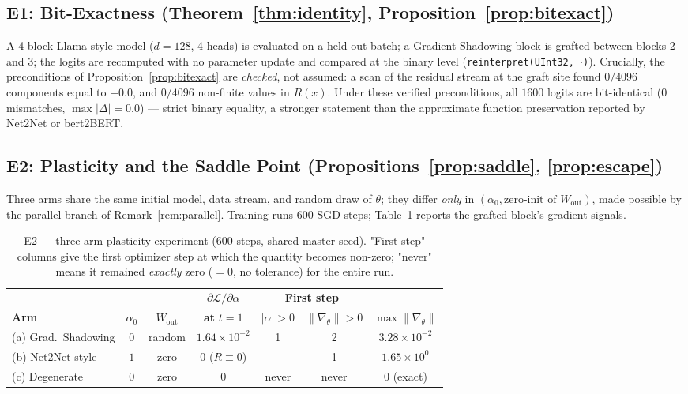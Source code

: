 \documentclass[11pt,a4paper]{article}
\newcommand{\Loss}{\mathcal{L}}
\begin{document}
\subsection{E1: Bit-Exactness (Theorem~\ref{thm:identity}, Proposition~\ref{prop:bitexact})}

A 4-block Llama-style model ($d=128$, 4 heads) is evaluated on a held-out batch; a Gradient-Shadowing block is grafted between blocks 2 and 3; the logits are recomputed with no parameter update and compared at the binary level (\texttt{reinterpret(UInt32, $\cdot$)}). Crucially, the preconditions of Proposition~\ref{prop:bitexact} are \emph{checked}, not assumed: a scan of the residual stream at the graft site found $0/4096$ components equal to $-0.0$, and $0/4096$ non-finite values in $R(x)$. Under these verified preconditions, all $1600$ logits are bit-identical ($0$ mismatches, $\max|\Delta| = 0.0$) --- strict binary equality, a stronger statement than the approximate function preservation reported by Net2Net or bert2BERT.

\subsection{E2: Plasticity and the Saddle Point (Propositions~\ref{prop:saddle}, \ref{prop:escape})}

Three arms share the same initial model, data stream, and random draw of $\theta$; they differ \emph{only} in $(\alpha_0, \text{zero-init of } W_{\mathrm{out}})$, made possible by the parallel branch of Remark~\ref{rem:parallel}. Training runs 600 SGD steps; Table~\ref{tab:e2} reports the grafted block's gradient signals.

\begin{table}[htbp]
\centering
\caption{E2 --- three-arm plasticity experiment (600 steps, shared master seed). "First step" columns give the first optimizer step at which the quantity becomes non-zero; "never" means it remained \emph{exactly} zero ($= 0$, no tolerance) for the entire run.}
\label{tab:e2}
\small
\setlength{\tabcolsep}{4pt}
\begin{tabular}{l c c c c c c}
\toprule
 & & & $\partial\Loss/\partial\alpha$ & \multicolumn{2}{c}{\textbf{First step}} & \\
\cmidrule(lr){5-6}
\textbf{Arm} & $\alpha_0$ & $W_{\mathrm{out}}$ & \textbf{at} $t{=}1$ & $|\alpha| > 0$ & $\|\nabla_\theta\| > 0$ & $\max\|\nabla_\theta\|$ \\
\midrule
(a) Grad.\ Shadowing & $0$ & random & $1.64 \times 10^{-2}$ & 1 & 2 & $3.28 \times 10^{-2}$ \\
(b) Net2Net-style    & $1$ & zero   & $0$ ($R \equiv 0$)     & --- & 1 & $1.65 \times 10^{0}$ \\
(c) Degenerate       & $0$ & zero   & $0$                    & never & never & $0$ (exact) \\
\bottomrule
\end{tabular}
\end{table}
\end{document}
